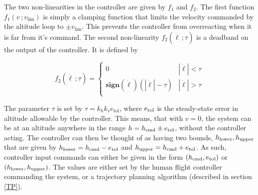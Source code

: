 \documentclass[11pt]{scrartcl} %
\begin{document}
The two non-linearities in the controller are given by $f_1$ and $f_2$. The first function $f_1(v\,;v_{\mathrm{lim}})$ is simply a clamping function that limits the velocity commanded by the altitude loop to $\pm v_{\mathrm{lim}}$. This prevents the controller from overreacting when it is far from it's command. The second non-linearity $f_2(\dot \ell \, ; \tau)$ is a deadband on the output of the controller. It is defined by 
\begin{center}
\begin{multicols}{2}
\null \vfill
\[
f_2(\dot \ell \, ; \tau) = \left\{\begin{array}{cc}
0 & |\dot \ell| < \tau \\ 
\mathrm{\textbf{sign}}(\dot \ell)(|\dot \ell| - \tau) & |\dot \ell| > \tau \\ 
\end{array}
\right.\] 
\vfill \null
{}
\end{multicols}
\end{center}

The parameter $\tau$ is set by $\tau = k_hk_ve_{\mathrm{tol}}$, where $e_{\mathrm{tol}}$ is the steady-state error in altitude allowable by the controller. This means, that with $v=0$, the system can be at an altitude anywhere in the range $h = h_{\mathrm{cmd}} \pm e_{\mathrm{tol}}$, without the controller acting. The controller can then be thought of as having two bounds, $h_{\mathrm{lower}},h_{\mathrm{upper}}$ that are given by $h_{\mathrm{lower}} = h_{\mathrm{cmd}} - e_{\mathrm{tol}}$ and $h_{\mathrm{upper}} = h_{\mathrm{cmd}} + e_{\mathrm{tol}}$. As such, controller input commands can either be given in the form $(h_{\mathrm{cmd}}, e_{\mathrm{tol}})$ or $(h_{\mathrm{lower}},h_{\mathrm{upper}})$. The values are either set by the human flight controller commanding the system, or a trajectory planning algorithm (described in section \ref{TP}).
\end{document}
